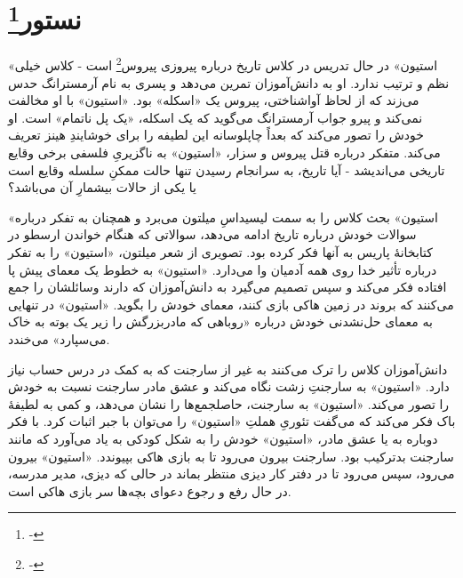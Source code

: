 \documentclass[12pt]{book}
\newcommand{\noun}[1]{«{#1}»}
\begin{document}
    \chapter[نستور]{نستور\protect\footnote{-}}\label{ep:2}
    \noun{استیون} در حال تدریس در کلاس تاریخ درباره پیروزی پیروس\footnote{-} است - کلاس خیلی نظم و ترتیب ندارد. او به دانش‌آموزان تمرین می‌دهد و پسری به نام آرمسترانگ حدس می‌زند که از لحاظ آواشناختی، پیروس یک «اسکله» بود. \noun{استیون} با او مخالفت نمی‌کند و پیرو جواب آرمسترانگ می‌گوید که یک اسکله، «یک پل ناتمام» است. او خودش را تصور می‌کند که بعداً چاپلوسانه این لطیفه را برای خوشایندِ هینز تعریف می‌کند. متفکر درباره قتل پیروس و سزار، \noun{استیون} به ناگزیریِ فلسفی برخی وقایع تاریخی می‌اندیشد - آیا تاریخ، به سرانجام رسیدن تنها حالت ممکنِ سلسله وقایع است یا یکی از حالات بیشمارِ آن می‌باشد؟

    \noun{استیون} بحث کلاس را به سمت لیسیداسِ میلتون می‌برد و همچنان به تفکر درباره سوالات خودش درباره تاریخ ادامه می‌دهد، سوالاتی که هنگام خواندن ارسطو در کتابخانۀ پاریس به آنها فکر کرده بود. تصویری از شعر میلتون، \noun{استیون} را به تفکر درباره تأثیر خدا روی همه آدمیان وا می‌دارد. \noun{استیون} به خطوط یک معمای پیش پا افتاده فکر می‌کند و سپس تصمیم می‌گیرد به دانش‌آموزان که دارند وسائلشان را جمع می‌کنند که بروند در زمین هاکی بازی کنند، معمای خودش را بگوید. \noun{استیون} در تنهایی به معمای حل‌نشدنی خودش درباره «روباهی که مادربزرگش را زیر یک بوته به خاک می‌سپارد» می‌خندد.

    دانش‌آموزان کلاس را ترک می‌کنند به غیر از سارجنت که به کمک در درس حساب نیاز دارد. \noun{استیون} به سارجنتِ زشت نگاه می‌کند و عشق مادر سارجنت نسبت به خودش را تصور می‌کند. \noun{استیون} به سارجنت، حاصلجمع‌ها را نشان می‌دهد، و کمی به لطیفۀ باک فکر می‌کند که می‌گفت تئوریِ هملتِ \noun{استیون} را می‌توان با جبر اثبات کرد. با فکر دوباره به  یا عشق مادر، \noun{استیون} خودش را به شکل کودکی به یاد می‌آورد که مانند سارجنت بدترکیب بود. سارجنت بیرون می‌رود تا به بازی هاکی بپیوندد. \noun{استیون} بیرون می‌رود، سپس می‌رود تا در دفتر کار دیزی منتظر بماند در حالی که دیزی، مدیر مدرسه، در حال رفع و رجوع دعوای بچه‌ها سر بازی هاکی است.
\end{document}
